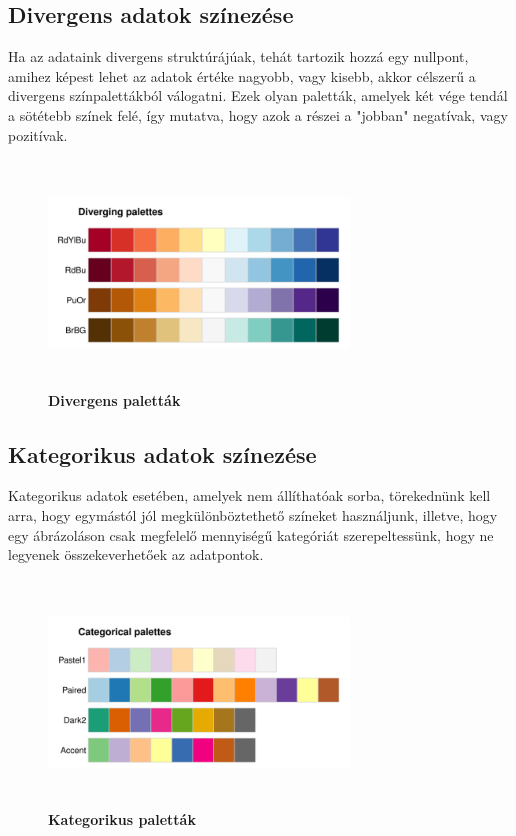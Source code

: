\documentclass[12pt]{article}
\theoremstyle{plain}
\begin{document}
\subsection{Divergens adatok színezése}
Ha az adataink divergens struktúrájúak, tehát tartozik hozzá egy nullpont, amihez képest lehet az adatok értéke nagyobb, vagy kisebb, akkor célszerű a divergens színpalettákból válogatni. Ezek olyan paletták, amelyek két vége tendál a sötétebb színek felé, így mutatva, hogy azok a részei a "jobban" negatívak, vagy pozitívak.

\begin{figure}[H]
   \centering
   \includegraphics[width=8cm, height=6cm]{media/diverging.png}
   \caption{\textbf{Divergens paletták}}
   \label{fig:GeneralDiagram}
\end{figure}

\subsection{Kategorikus adatok színezése}
Kategorikus adatok esetében, amelyek nem állíthatóak sorba, törekednünk kell arra, hogy egymástól jól megkülönböztethető színeket használjunk, illetve, hogy egy ábrázoláson csak megfelelő mennyiségű kategóriát szerepeltessünk, hogy ne legyenek összekeverhetőek az adatpontok.



\begin{figure}[H]
   \centering
   \includegraphics[width=8cm, height=6cm]{media/categorical.png}
   \caption{\textbf{Kategorikus paletták}}
   \label{fig:GeneralDiagram}
\end{figure}
\end{document}

